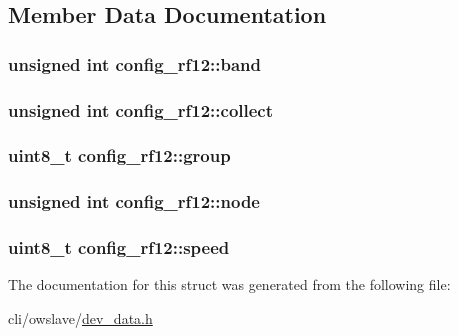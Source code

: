 \subsection{Member Data Documentation}
\hypertarget{structconfig__rf12_abb4aae82e8879f73368fa8d94145b715}{
\subsubsection[{band}]{\setlength{\rightskip}{0pt plus 5cm}unsigned int config\-\_\-rf12\-::band}}\label{structconfig__rf12_abb4aae82e8879f73368fa8d94145b715}
\hypertarget{structconfig__rf12_a217f695af8276c1da733e13bbdeab5a5}{
\subsubsection[{collect}]{\setlength{\rightskip}{0pt plus 5cm}unsigned int config\-\_\-rf12\-::collect}}\label{structconfig__rf12_a217f695af8276c1da733e13bbdeab5a5}
\hypertarget{structconfig__rf12_a6993b16dd675ec59f3747ed5f9510de8}{
\subsubsection[{group}]{\setlength{\rightskip}{0pt plus 5cm}uint8\-\_\-t config\-\_\-rf12\-::group}}\label{structconfig__rf12_a6993b16dd675ec59f3747ed5f9510de8}
\hypertarget{structconfig__rf12_a9389bb8256b99c8743c6ab0d0b9d84f0}{
\subsubsection[{node}]{\setlength{\rightskip}{0pt plus 5cm}unsigned int config\-\_\-rf12\-::node}}\label{structconfig__rf12_a9389bb8256b99c8743c6ab0d0b9d84f0}
\hypertarget{structconfig__rf12_a43fcf6110e6a133c6982081885f27de9}{
\subsubsection[{speed}]{\setlength{\rightskip}{0pt plus 5cm}uint8\-\_\-t config\-\_\-rf12\-::speed}}\label{structconfig__rf12_a43fcf6110e6a133c6982081885f27de9}


The documentation for this struct was generated from the following file\-:\begin{DoxyCompactItemize}
\item 
cli/owslave/\hyperlink{dev__data_8h}{dev\-\_\-data.\-h}\end{DoxyCompactItemize}
